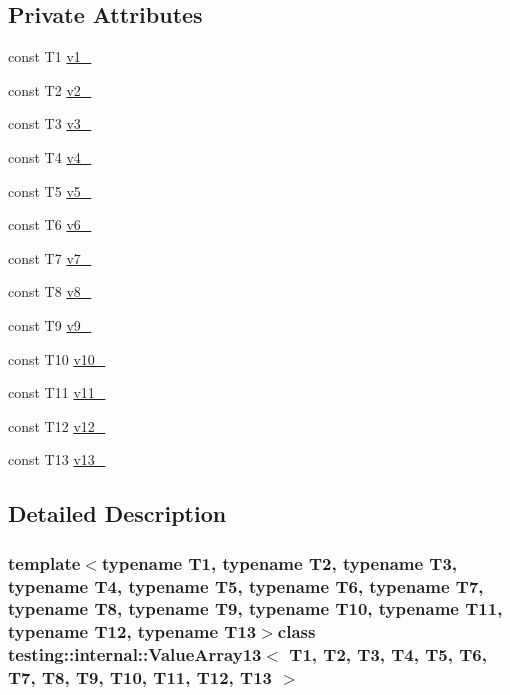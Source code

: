 \subsection*{\-Private \-Attributes}
\begin{DoxyCompactItemize}
\item 
const \-T1 \hyperlink{classtesting_1_1internal_1_1ValueArray13_aac1d0654cc6c1aceb4a5d0fa7a98042e}{v1\-\_\-}
\item 
const \-T2 \hyperlink{classtesting_1_1internal_1_1ValueArray13_a9f0a8ce6ce2fd27e980c4c51a7a7256a}{v2\-\_\-}
\item 
const \-T3 \hyperlink{classtesting_1_1internal_1_1ValueArray13_a4f8257321a2eab0456239174d6712d5e}{v3\-\_\-}
\item 
const \-T4 \hyperlink{classtesting_1_1internal_1_1ValueArray13_aac184059fee257381ccae81d8d112f85}{v4\-\_\-}
\item 
const \-T5 \hyperlink{classtesting_1_1internal_1_1ValueArray13_a1f3e0ada8419ed2e17cc61e6c0c54404}{v5\-\_\-}
\item 
const \-T6 \hyperlink{classtesting_1_1internal_1_1ValueArray13_a13d84d5824617bbc6fb1a6b3ee3cb745}{v6\-\_\-}
\item 
const \-T7 \hyperlink{classtesting_1_1internal_1_1ValueArray13_a4063f0b7a528133d018ee488ba44a9a3}{v7\-\_\-}
\item 
const \-T8 \hyperlink{classtesting_1_1internal_1_1ValueArray13_a596bc5260b2474271d1f6910ff6f665d}{v8\-\_\-}
\item 
const \-T9 \hyperlink{classtesting_1_1internal_1_1ValueArray13_a6356e16cf54a9dfac8525f20242af31e}{v9\-\_\-}
\item 
const \-T10 \hyperlink{classtesting_1_1internal_1_1ValueArray13_a147ca4457ea439b00a93087231ff77ef}{v10\-\_\-}
\item 
const \-T11 \hyperlink{classtesting_1_1internal_1_1ValueArray13_a12a4baf9ab57c7e9b5b4f1612e59e529}{v11\-\_\-}
\item 
const \-T12 \hyperlink{classtesting_1_1internal_1_1ValueArray13_a35ffe6d4d723857722ab319a235eddfc}{v12\-\_\-}
\item 
const \-T13 \hyperlink{classtesting_1_1internal_1_1ValueArray13_a8c6e803e306975fc3ed6717875688efa}{v13\-\_\-}
\end{DoxyCompactItemize}


\subsection{\-Detailed \-Description}
\subsubsection*{template$<$typename T1, typename T2, typename T3, typename T4, typename T5, typename T6, typename T7, typename T8, typename T9, typename T10, typename T11, typename T12, typename T13$>$class testing\-::internal\-::\-Value\-Array13$<$ T1, T2, T3, T4, T5, T6, T7, T8, T9, T10, T11, T12, T13 $>$}



